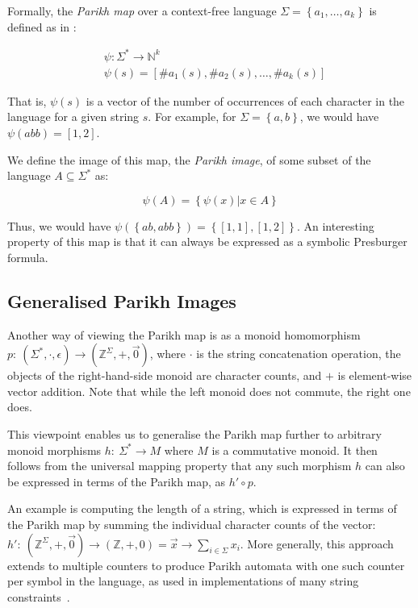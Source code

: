 \documentclass{easychair}
\begin{document}
Formally, the \textit{Parikh map} over a context-free language $\Sigma = \left\{a_1, \ldots, a_k \right\}$ is defined as in \cite{kozen}:

$$
\begin{aligned}
& \psi: \Sigma^* \rightarrow \mathbb{N}^k \\
& \psi(s) = \left[\#a_1(s), \#a_2(s), \ldots, \#a_k(s)\right]
\end{aligned}
$$

That is, $\psi(s)$ is a vector of the number of occurrences of each character in the language for a given string $s$. For example, for  $\Sigma = \left \{ a, b\right\}$, we would have $\psi(abb) = \left[1, 2\right]$.

We define the image of this map, the \textit{Parikh image}, of some subset of the language $A \subseteq \Sigma^*$ as:

$$
\psi(A) = \left\{ \psi(x) | x \in A \right\}
$$

Thus, we would have $\psi(\left\{ab, abb\right\}) = \left\{\left[1, 1\right], \left[1, 2\right]\right\}$. An interesting property of this map is that it can always be expressed as a symbolic Presburger formula.

\subsection{Generalised Parikh Images}\label{sec:generalised}

Another way of viewing the Parikh map is as a monoid homomorphism $p:\: \left(\Sigma^*, \cdot, \epsilon \right) \to (\mathbb{Z}^\Sigma, +, \vec{0})$, where $\cdot$ is the string concatenation operation, the objects of the right-hand-side monoid are character counts, and $+$ is element-wise vector addition. Note that while the left monoid does not commute, the right one does.

This viewpoint enables us to generalise the Parikh map further to arbitrary monoid morphisms $h:\: \Sigma^* \to M$ where $M$ is a commutative monoid. It then follows from the universal mapping property that any such morphism $h$ can also be expressed in terms of the Parikh map, as $h' \circ p$.

An example is computing the length of a string, which is expressed in terms of
the Parikh map by summing the individual character counts of the vector: $h':\:
(\mathbb{Z}^\Sigma, +, \vec{0}) \to (\mathbb{Z}, +, 0) = \vec{x} \to \sum_{i \in
\Sigma} x_i$. More generally, this approach extends to multiple counters to
produce Parikh automata with one such counter per symbol in the language, as
used in implementations of many string
constraints~\cite{path-feasibility-strings}.
\end{document}
